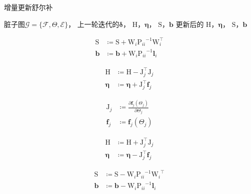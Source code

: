 \begin{algorithm}
\caption{增量更新舒尔补}
\begin{algorithmic}
    \Require 脏子图$\mathcal{G}=\{\mathcal{F},\Theta,\mathcal{E}\}$，
             上一轮迭代的$\bm{\delta}$，
             $\mathrm{H}$，$\bm{\eta}$，
             $\mathrm{S}$，$\bm{b}$
    \Ensure 更新后的
            $\mathrm{H}$，$\bm{\eta}$，
            $\mathrm{S}$，$\bm{b}$

        \[\begin{aligned}
                \mathrm{S} &\coloneqq \mathrm{S} + \mathrm{W}_i{\mathrm{P}_{ii}}^{-1}\mathrm{W}_i^\top \\
                \bm{b}     &\coloneqq \bm{b}     + \mathrm{W}_i{\mathrm{P}_{ii}}^{-1}\bm{l}_i
        \end{aligned}\]
    \EndFor

        \[\begin{aligned}
                \mathrm{H} &\coloneqq \mathrm{H} - \mathrm{J}_j^\top \mathrm{J}_j \\
                \bm{\eta}  &\coloneqq \bm{\eta} + \mathrm{J}_j^\top \bm{f}_j
        \end{aligned}\]

        \[\begin{aligned}
                \mathrm{J}_j &\coloneqq \frac{\partial{\bm{f}_j(\Theta_j)}}
                                             {\partial{\Theta_j}} \\
                \bm{f}_j     &\coloneqq \bm{f}_j(\Theta_j)
        \end{aligned}\]

        \[\begin{aligned}
                \mathrm{H} &\coloneqq \mathrm{H} + \mathrm{J}_j^\top\mathrm{J}_j \\
                \bm{\eta}  &\coloneqq \bm{\eta}  - \mathrm{J}_j^\top\bm{f}_j
        \end{aligned}\]
    \EndFor

        \[\begin{aligned}
                \mathrm{S} &\coloneqq \mathrm{S} - \mathrm{W}_i{\mathrm{P}_{ii}}^{-1}{\mathrm{W}_i}^\top \\
                \bm{b}     &\coloneqq \bm{b}     - \mathrm{W}_i{\mathrm{P}_{ii}}^{-1}\bm{l}_i
        \end{aligned}\]
    \EndFor

\end{algorithmic}
\label{alg:schur_update}
\end{algorithm}
